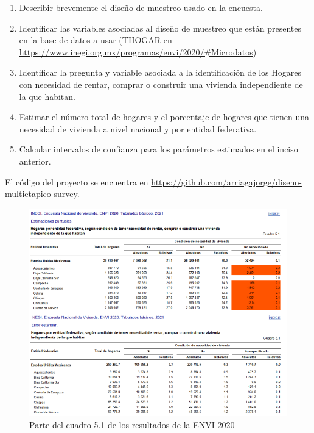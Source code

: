 \documentclass[
]{article}
\providecommand{\tightlist}{%
  \setlength{\itemsep}{0pt}\setlength{\parskip}{0pt}}
\begin{document}
\begin{enumerate}
\def\labelenumi{\roman{enumi}.}
\tightlist
\item
  Describir brevemente el diseño de muestreo usado en la encuesta.
\item
  Identificar las variables asociadas al diseño de muestreo que están
  presentes en la base de datos a usar (THOGAR en
  \url{https://www.inegi.org.mx/programas/envi/2020/\#Microdatos})
\item
  Identificar la pregunta y variable asociada a la identificación de los
  Hogares con necesidad de rentar, comprar o construir una vivienda
  independiente de la que habitan.
\item
  Estimar el número total de hogares y el porcentaje de hogares que tienen una necesidad de vivienda a nivel nacional y por entidad federativa.
\item
  Calcular intervalos de confianza para los parámetros estimados en el inciso anterior.
\end{enumerate}

El código del proyecto se encuentra en \href{https://github.com/arriagajorge/diseno-multietapico-survey}{https://github.com/arriagajorge/diseno-multietapico-survey}.

\begin{figure}[H]
\centering
    \includegraphics[width=160mm]{images/ENVI2020.png}
    \caption{Parte del cuadro 5.1 de los resultados de la ENVI 2020}
    \label{Envi2020}
\end{figure}
\end{document}
